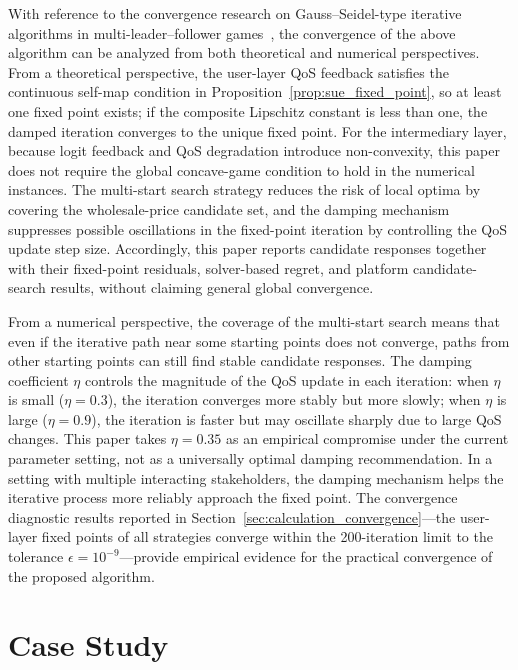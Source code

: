 \documentclass[11pt,a4paper]{article}
\begin{document}
With reference to the convergence research on Gauss--Seidel-type iterative algorithms in multi-leader--follower games~\cite{wang2026hierarchical}, the convergence of the above algorithm can be analyzed from both theoretical and numerical perspectives. From a theoretical perspective, the user-layer QoS feedback satisfies the continuous self-map condition in Proposition~\ref{prop:sue_fixed_point}, so at least one fixed point exists; if the composite Lipschitz constant is less than one, the damped iteration converges to the unique fixed point. For the intermediary layer, because logit feedback and QoS degradation introduce non-convexity, this paper does not require the global concave-game condition to hold in the numerical instances. The multi-start search strategy reduces the risk of local optima by covering the wholesale-price candidate set, and the damping mechanism suppresses possible oscillations in the fixed-point iteration by controlling the QoS update step size. Accordingly, this paper reports candidate responses together with their fixed-point residuals, solver-based regret, and platform candidate-search results, without claiming general global convergence.

From a numerical perspective, the coverage of the multi-start search means that even if the iterative path near some starting points does not converge, paths from other starting points can still find stable candidate responses. The damping coefficient $\eta$ controls the magnitude of the QoS update in each iteration: when $\eta$ is small ($\eta=0.3$), the iteration converges more stably but more slowly; when $\eta$ is large ($\eta=0.9$), the iteration is faster but may oscillate sharply due to large QoS changes. This paper takes $\eta=0.35$ as an empirical compromise under the current parameter setting, not as a universally optimal damping recommendation. In a setting with multiple interacting stakeholders, the damping mechanism helps the iterative process more reliably approach the fixed point. The convergence diagnostic results reported in Section~\ref{sec:calculation_convergence}---the user-layer fixed points of all strategies converge within the 200-iteration limit to the tolerance $\epsilon=10^{-9}$---provide empirical evidence for the practical convergence of the proposed algorithm.

\section{Case Study}
\label{sec:case_study}
\end{document}
